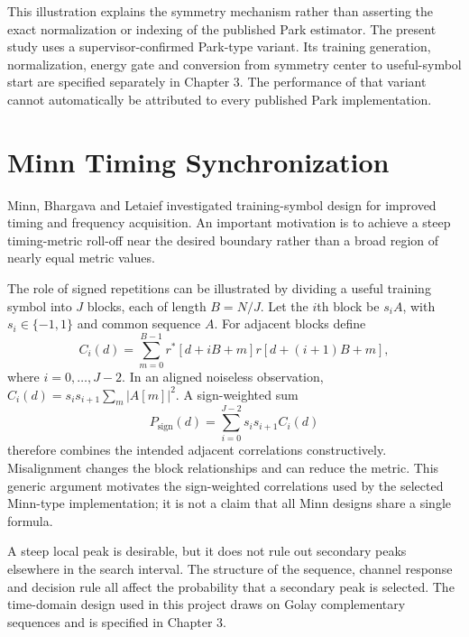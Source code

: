 This illustration explains the symmetry mechanism rather than asserting the exact normalization or indexing of the published Park estimator. The present study uses a supervisor-confirmed Park-type variant. Its training generation, normalization, energy gate and conversion from symmetry center to useful-symbol start are specified separately in Chapter 3. The performance of that variant cannot automatically be attributed to every published Park implementation.

\section{Minn Timing Synchronization}
Minn, Bhargava and Letaief \cite{minn2003} investigated training-symbol design for improved timing and frequency acquisition. An important motivation is to achieve a steep timing-metric roll-off near the desired boundary rather than a broad region of nearly equal metric values.

The role of signed repetitions can be illustrated by dividing a useful training symbol into $J$ blocks, each of length $B=N/J$. Let the $i$th block be $s_i A$, with $s_i\in\{-1,1\}$ and common sequence $A$. For adjacent blocks define
\begin{equation}
 C_i(d)=\sum_{m=0}^{B-1}r^*[d+iB+m]r[d+(i+1)B+m],
\end{equation}
where $i=0,\ldots,J-2$. In an aligned noiseless observation, $C_i(d)=s_i s_{i+1}\sum_m|A[m]|^2$. A sign-weighted sum
\begin{equation}
 P_{\mathrm{sign}}(d)=\sum_{i=0}^{J-2}s_i s_{i+1}C_i(d)
\end{equation}
therefore combines the intended adjacent correlations constructively. Misalignment changes the block relationships and can reduce the metric. This generic argument motivates the sign-weighted correlations used by the selected Minn-type implementation; it is not a claim that all Minn designs share a single formula.

A steep local peak is desirable, but it does not rule out secondary peaks elsewhere in the search interval. The structure of the sequence, channel response and decision rule all affect the probability that a secondary peak is selected. The time-domain design used in this project draws on Golay complementary sequences \cite{golay1961} and is specified in Chapter 3.

